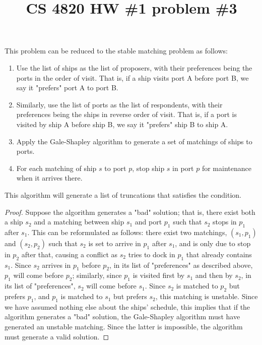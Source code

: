 
\usepackage[utf8]{inputenc}
\usepackage[english]{babel}
\usepackage{amsthm}

\title{CS 4820 HW \#1 problem \#3}
\maketitle
This problem can be reduced to the stable matching problem as follows:

\begin{enumerate}
	\item Use the list of ships as the list of proposers, with their preferences being the ports in the order of visit. That is, if a ship visits port A before port B, we say it "prefers" port A to port B.
	\item Similarly, use the list of ports as the list of respondents, with their preferences being the ships in reverse order of visit. That is, if a port is visited by ship A before ship B, we say it "prefers" ship B to ship A.
	\item Apply the Gale-Shapley algorithm to generate a set of matchings of ships to ports.
	\item For each matching of ship $s$ to port $p$, stop ship $s$ in port $p$ for maintenance when it arrives there.
\end{enumerate}

This algorithm will generate a list of truncations that satisfies the condition.

\begin{proof}
	Suppose the algorithm generates a "bad" solution; that is, there exist both a ship $s_2$ and a matching between ship $s_1$ and port $p_1$ such that $s_2$ stops in $p_1$ after $s_1$. This can be reformulated as follows: there exist two matchings, $(s_1, p_1)$ and $(s_2, p_2)$ such that $s_2$ is set to arrive in $p_1$ after $s_1$, and is only due to stop in $p_2$ after that, causing a conflict as $s_2$ tries to dock in $p_1$ that already contains $s_1$. Since $s_2$ arrives in $p_1$ before $p_2$, in its list of "preferences" as described above, $p_1$ will come before $p_2$; similarly, since $p_1$ is visited first by $s_1$ and then by $s_2$, in its list of "preferences", $s_2$ will come before $s_1$. Since $s_2$ is matched to $p_2$ but prefers $p_1$, and $p_1$ is matched to $s_1$ but prefers $s_2$, this matching is unstable. Since we have assumed nothing else about the ships' schedule, this implies that if the algorithm generates a "bad" solution, the Gale-Shapley algorithm must have generated an unstable matching. Since the latter is impossible, the algorithm must generate a valid solution.
\end{proof}
